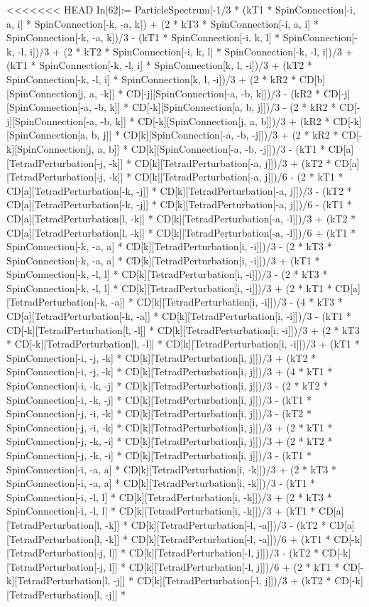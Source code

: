 <<<<<<< HEAD
In[62]:= ParticleSpectrum[-1/3 * (kT1 * SpinConnection[-i, a, i] * SpinConnection[-k, -a, k]) + (2 * kT3 * SpinConnection[-i, a, i] * SpinConnection[-k, -a, k])/3 - (kT1 * SpinConnection[-i, k, l] * SpinConnection[-k, -l, i])/3 + (2 * kT2 * SpinConnection[-i, k, l] * SpinConnection[-k, -l, i])/3 + (kT1 * SpinConnection[-k, -l, i] * SpinConnection[k, l, -i])/3 + (kT2 * SpinConnection[-k, -l, i] * SpinConnection[k, l, -i])/3 + (2 * kR2 * CD[b][SpinConnection[j, a, -k]] * CD[-j][SpinConnection[-a, -b, k]])/3 - (kR2 * CD[-j][SpinConnection[-a, -b, k]] * CD[-k][SpinConnection[a, b, j]])/3 - (2 * kR2 * CD[-j][SpinConnection[-a, -b, k]] * CD[-k][SpinConnection[j, a, b]])/3 + (kR2 * CD[-k][SpinConnection[a, b, j]] * CD[k][SpinConnection[-a, -b, -j]])/3 + (2 * kR2 * CD[-k][SpinConnection[j, a, b]] * CD[k][SpinConnection[-a, -b, -j]])/3 - (kT1 * CD[a][TetradPerturbation[-j, -k]] * CD[k][TetradPerturbation[-a, j]])/3 + (kT2 * CD[a][TetradPerturbation[-j, -k]] * CD[k][TetradPerturbation[-a, j]])/6 - (2 * kT1 * CD[a][TetradPerturbation[-k, -j]] * CD[k][TetradPerturbation[-a, j]])/3 - (kT2 * CD[a][TetradPerturbation[-k, -j]] * CD[k][TetradPerturbation[-a, j]])/6 - (kT1 * CD[a][TetradPerturbation[l, -k]] * CD[k][TetradPerturbation[-a, -l]])/3 + (kT2 * CD[a][TetradPerturbation[l, -k]] * CD[k][TetradPerturbation[-a, -l]])/6 + (kT1 * SpinConnection[-k, -a, a] * CD[k][TetradPerturbation[i, -i]])/3 - (2 * kT3 * SpinConnection[-k, -a, a] * CD[k][TetradPerturbation[i, -i]])/3 + (kT1 * SpinConnection[-k, -l, l] * CD[k][TetradPerturbation[i, -i]])/3 - (2 * kT3 * SpinConnection[-k, -l, l] * CD[k][TetradPerturbation[i, -i]])/3 + (2 * kT1 * CD[a][TetradPerturbation[-k, -a]] * CD[k][TetradPerturbation[i, -i]])/3 - (4 * kT3 * CD[a][TetradPerturbation[-k, -a]] * CD[k][TetradPerturbation[i, -i]])/3 - (kT1 * CD[-k][TetradPerturbation[l, -l]] * CD[k][TetradPerturbation[i, -i]])/3 + (2 * kT3 * CD[-k][TetradPerturbation[l, -l]] * CD[k][TetradPerturbation[i, -i]])/3 + (kT1 * SpinConnection[-i, -j, -k] * CD[k][TetradPerturbation[i, j]])/3 + (kT2 * SpinConnection[-i, -j, -k] * CD[k][TetradPerturbation[i, j]])/3 + (4 * kT1 * SpinConnection[-i, -k, -j] * CD[k][TetradPerturbation[i, j]])/3 - (2 * kT2 * SpinConnection[-i, -k, -j] * CD[k][TetradPerturbation[i, j]])/3 - (kT1 * SpinConnection[-j, -i, -k] * CD[k][TetradPerturbation[i, j]])/3 - (kT2 * SpinConnection[-j, -i, -k] * CD[k][TetradPerturbation[i, j]])/3 + (2 * kT1 * SpinConnection[-j, -k, -i] * CD[k][TetradPerturbation[i, j]])/3 + (2 * kT2 * SpinConnection[-j, -k, -i] * CD[k][TetradPerturbation[i, j]])/3 - (kT1 * SpinConnection[-i, -a, a] * CD[k][TetradPerturbation[i, -k]])/3 + (2 * kT3 * SpinConnection[-i, -a, a] * CD[k][TetradPerturbation[i, -k]])/3 - (kT1 * SpinConnection[-i, -l, l] * CD[k][TetradPerturbation[i, -k]])/3 + (2 * kT3 * SpinConnection[-i, -l, l] * CD[k][TetradPerturbation[i, -k]])/3 + (kT1 * CD[a][TetradPerturbation[l, -k]] * CD[k][TetradPerturbation[-l, -a]])/3 - (kT2 * CD[a][TetradPerturbation[l, -k]] * CD[k][TetradPerturbation[-l, -a]])/6 + (kT1 * CD[-k][TetradPerturbation[-j, l]] * CD[k][TetradPerturbation[-l, j]])/3 - (kT2 * CD[-k][TetradPerturbation[-j, l]] * CD[k][TetradPerturbation[-l, j]])/6 + (2 * kT1 * CD[-k][TetradPerturbation[l, -j]] * CD[k][TetradPerturbation[-l, j]])/3 + (kT2 * CD[-k][TetradPerturbation[l, -j]] * 